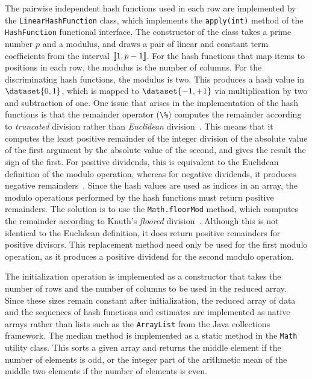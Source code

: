 The pairwise independent hash functions used in each row are implemented by the \lstinline{LinearHashFunction} class, which implements the \lstinline{apply(int)} method of the \lstinline{HashFunction} functional interface.
The constructor of the class takes a prime number \( p \) and a modulus, and draws a pair of linear and constant term coefficients from the interval \( \llbracket1, p - 1\rrbracket \).
For the hash functions that map items to positions in each row, the modulus is the number of columns.
For the discriminating hash functions, the modulus is two.
This produces a hash value in \( \dataset{0, 1} \), which is mapped to \( \dataset{-1, +1} \) via multiplication by two and subtraction of one.
One issue that arises in the implementation of the hash functions is that the remainder operator (\lstinline{\%}) computes the remainder according to \emph{truncated} division rather than \emph{Euclidean} division~\citep{o14}.
This means that it computes the least positive remainder of the integer division of the absolute value of the first argument by the absolute value of the second, and gives the result the sign of the first.
For positive dividends, this is equivalent to the Euclidean definition of the modulo operation, whereas for negative dividends, it produces negative remainders~\citep{boute92}.
Since the hash values are used as indices in an array, the modulo operations performed by the hash functions must return positive remainders.
The solution is to use the \lstinline{Math.floorMod} method, which computes the remainder according to Knuth's \emph{floored} division~\citep{knuth97,o14}.
Although this is not identical to the Euclidean definition, it does return positive remainders for positive divisors.
This replacement method need only be used for the first modulo operation, as it produces a positive dividend for the second modulo operation.

The initialization operation is implemented as a constructor that takes the number of rows and the number of columns to be used in the reduced array.
Since these sizes remain constant after initialization, the reduced array of data and the sequences of hash functions and estimates are implemented as native arrays rather than lists such as the \lstinline{ArrayList} from the Java collections framework.
The median method is implemented as a static method in the \lstinline{Math} utility class.
This sorts a given array and returns the middle element if the number of elements is odd, or the integer part of the arithmetic mean of the middle two elements if the number of elements is even.

